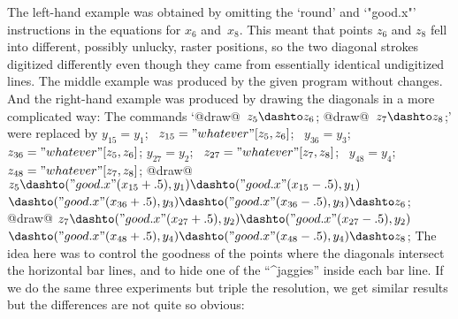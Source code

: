 \enddisplay
The left-hand example was obtained by omitting the `round' and `"good.x"'
instructions in the equations for $x_6$ and~$x_8$. This meant that points
$z_6$ and $z_8$ fell into different, possibly unlucky, raster positions,
so the two diagonal strokes digitized differently even though they
came from essentially identical undigitized lines. The middle example
was produced by the given program without changes. And the right-hand
example was produced by drawing the diagonals in a more complicated way:
The commands `@draw@~$z_5\dashto z_6$; @draw@~$z_7\dashto z_8$;' were
replaced by
\begindisplay
$y_{15}=y_1$; \ $z_{15}="whatever"[z_5,z_6]$; \
 $y_{36}=y_3$; \ $z_{36}="whatever"[z_5,z_6]$;\cr
$y_{27}=y_2$; \ $z_{27}="whatever"[z_7,z_8]$; \
 $y_{48}=y_4$; \ $z_{48}="whatever"[z_7,z_8]$;\cr
\noalign{\smallskip}
@draw@ $z_5\dashto("good.x"(x_{15}+.5),y_1)\dashto("good.x"(x_{15}-.5),y_1)$\cr
\qquad\qquad$\dashto("good.x"(x_{36}+.5),y_3)\dashto("good.x"(x_{36}-.5),y_3)
 \dashto z_6$;\cr
@draw@ $z_7\dashto("good.x"(x_{27}+.5),y_2)\dashto("good.x"(x_{27}-.5),y_2)$\cr
\qquad\qquad$\dashto("good.x"(x_{48}+.5),y_4)\dashto("good.x"(x_{48}-.5),y_4)
 \dashto z_8$;\cr
\enddisplay
The idea here was to control the goodness of the points where the
diagonals intersect the horizontal bar lines, and to hide one of the
``^{jaggies}'' inside each bar line. If we do the same three experiments
but triple the resolution, we get similar results but the differences are
not quite so obvious:
\begindisplay
